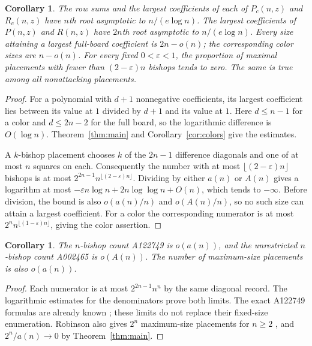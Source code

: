 \documentclass[11pt]{article}
\newtheorem{corollary}[theorem]{Corollary}
\begin{document}
\begin{corollary}\label{cor:coefficients}
The row sums and the largest coefficients of each of $P_c(n,z)$ and
$R_c(n,z)$ have $n$th root asymptotic to $n/(e\log n)$.
The largest coefficients of $P(n,z)$ and $R(n,z)$ have $2n$th root
asymptotic to $n/(e\log n)$.
Every size attaining a largest full-board coefficient is $2n-o(n)$;
the corresponding color sizes are $n-o(n)$.
For every fixed $0<\varepsilon<1$, the proportion of maximal placements
with fewer than $(2-\varepsilon)n$ bishops tends to zero.
The same is true among all nonattacking placements.
\end{corollary}
\begin{proof}
For a polynomial with $d+1$ nonnegative coefficients, its largest
coefficient lies between its value at $1$ divided by $d+1$ and its
value at $1$. Here $d\leq n-1$ for a color and $d\leq2n-2$ for the
full board, so the logarithmic difference is $O(\log n)$.
Theorem~\ref{thm:main} and Corollary~\ref{cor:colors} give the estimates.

A $k$-bishop placement chooses $k$ of the $2n-1$ difference diagonals
and one of at most $n$ squares on each. Consequently the number with
at most $\lfloor(2-\varepsilon)n\rfloor$ bishops is at most
$2^{2n-1}n^{\lfloor(2-\varepsilon)n\rfloor}$.
Dividing by either $a(n)$ or $A(n)$ gives a logarithm at most
$-\varepsilon n\log n+2n\log\log n+O(n)$, which tends to
$-\infty$. Before division, the bound is also $o(a(n)/n)$ and
$o(A(n)/n)$, so no such size can attain a largest coefficient.
For a color the corresponding numerator is at most
$2^n n^{\lfloor(1-\varepsilon)n\rfloor}$, giving the color assertion.
\end{proof}

\begin{corollary}\label{cor:fixedsize}
The $n$-bishop count A122749 is $o(a(n))$, and the unrestricted
$n$-bishop count A002465 is $o(A(n))$.
The number of maximum-size placements is also $o(a(n))$.
\end{corollary}
\begin{proof}
Each numerator is at most $2^{2n-1}n^n$ by the same diagonal record.
The logarithmic estimates for the denominators prove both limits.
The exact A122749 formulas are already known \cite{robinson};
these limits do not replace their fixed-size enumeration.
Robinson also gives $2^n$ maximum-size placements for $n\geq2$
\cite[Section 4, p.~213]{robinson}, and $2^n/a(n)\to0$ by
Theorem~\ref{thm:main}.
\end{proof}
\end{document}
